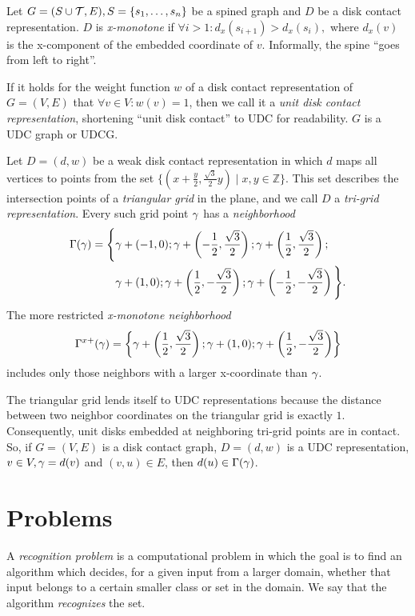 Let $G = (S \cup \mathcal T, E), S = \{ s_1, \ldots, s_n \}$ be a spined graph and $D$ be a disk contact representation. $D$ is \emph{x-monotone} if $\forall i > 1: d_x(s_{i+1}) > d_x(s_i),$ where $d_x(v)$ is the x-component of the embedded coordinate of $v$. Informally, the spine ``goes from left to right''.

If it holds for the weight function $w$ of a disk contact representation of $G = (V, E)$ that $\forall v\in V: w(v) = 1$, then we call it a \emph{unit disk contact representation}, shortening ``unit disk contact'' to UDC for readability. $G$ is a UDC graph or UDCG.

Let $D = (d, w)$ be a weak disk contact representation in which $d$ maps all vertices to points from the set $\{ (x + \frac y2, \frac{\sqrt3}2 y) \mid x, y \in \mathbb Z \}$. This set describes the intersection points of a \emph{triangular grid} in the plane, and we call $D$ a \emph{tri-grid representation}. Every such grid point $\gamma$ has a \emph{neighborhood}
\begin{align*}\Gamma(\gamma) = \Bigg\{ &\gamma + (-1, 0); \gamma + \left(-\frac12, \frac{\sqrt3}2\right); \gamma + \left(\frac12, \frac{\sqrt3}2\right);\\
&\gamma + (1, 0); \gamma + \left(\frac12, -\frac{\sqrt3}2\right); \gamma + \left(-\frac12, -\frac{\sqrt3}2\right) \Bigg\}.\end{align*}
The more restricted \emph{x-monotone neighborhood}
\begin{align*}\Gamma^{x+}(\gamma) = \left\{ \gamma + \left(\frac12, \frac{\sqrt3}2\right); \gamma + (1, 0); \gamma + \left(\frac12, -\frac{\sqrt3}2\right) \right\}\end{align*}
includes only those neighbors with a larger x-coordinate than $\gamma$.

The triangular grid lends itself to UDC representations because the distance between two neighbor coordinates on the triangular grid is exactly $1$. Consequently, unit disks embedded at neighboring tri-grid points are in contact. So, if $G = (V, E)$ is a disk contact graph, $D = (d, w)$ is a UDC representation, $v \in V, \gamma = d(v)$ and $(v, u) \in E$, then $d(u) \in \Gamma(\gamma)$.

\section{Problems}

A \emph{recognition problem} is a computational problem in which the goal is to find an algorithm which decides, for a given input from a larger domain, whether that input belongs to a certain smaller class or set in the domain. We say that the algorithm \emph{recognizes} the set.

